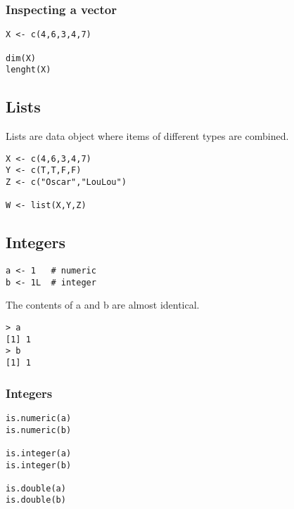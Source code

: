 \documentclass[a4paper,12pt]{article}
\begin{document}
\subsubsection*{Inspecting a vector}
\begin{framed}
\begin{verbatim}
X <- c(4,6,3,4,7)

dim(X)
lenght(X)
\end{verbatim}
\end{framed}

\subsection*{Lists}
Lists are data object where items of different types are combined.

\begin{framed}
\begin{verbatim}
X <- c(4,6,3,4,7)
Y <- c(T,T,F,F)
Z <- c("Oscar","LouLou")

W <- list(X,Y,Z)
\end{verbatim}
\end{framed}

\subsection*{Integers}

\begin{framed}
\begin{verbatim}
a <- 1   # numeric
b <- 1L  # integer
\end{verbatim}
\end{framed}

The contents of a and b are almost identical.

\begin{verbatim}
> a
[1] 1
> b
[1] 1
\end{verbatim}
\subsubsection*{Integers}

\begin{framed}
\begin{verbatim}
is.numeric(a)
is.numeric(b)

is.integer(a)
is.integer(b)

is.double(a)
is.double(b)
\end{verbatim}
\end{framed}
\end{document}
